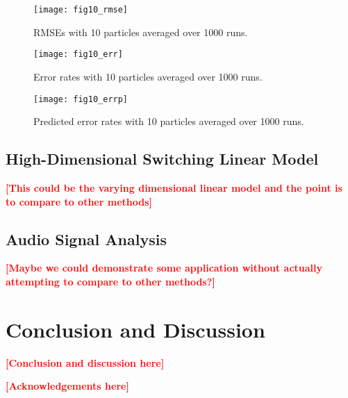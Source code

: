 \documentclass[twocolumn]{autart}    %
\newcommand{\comment}[1]{\textcolor{red}{\textbf{[#1]}}}
\begin{document}
\begin{figure}[htb]
\begin{center}
\texttt{[image: fig10\_rmse]}
\end{center}
\caption{RMSEs with 10 particles averaged over 1000 runs.}
\label{fig:10_rmse}
\end{figure}

\begin{figure}[htb]
\begin{center}
\texttt{[image: fig10\_err]}
\end{center}
\caption{Error rates with 10 particles averaged over 1000 runs.}
\label{fig:10_err}
\end{figure}

\begin{figure}[htb]
\begin{center}
\texttt{[image: fig10\_errp]}
\end{center}
\caption{Predicted error rates with 10 particles averaged over 1000
  runs.}
\label{fig:10_errp}
\end{figure}


\subsection{High-Dimensional Switching Linear Model}

\comment{This could be the varying dimensional linear model and the
point is to compare to other methods}

\subsection{Audio Signal Analysis}

\comment{Maybe we could demonstrate some application without actually
attempting to compare to other methods?}


\section{Conclusion and Discussion}

\comment{Conclusion and discussion here}



\begin{ack}                               %
\comment{Acknowledgements here}
\end{ack}
\end{document}

